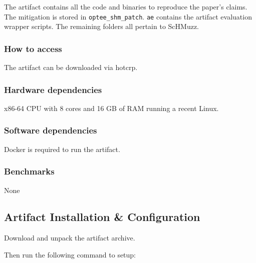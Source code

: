 \documentclass[conference]{IEEEtran}
\begin{document}

The artifact contains all the code and binaries to reproduce the paper's claims. 
The mitigation is stored in \texttt{optee\_shm\_patch}. \texttt{ae} contains the artifact evaluation wrapper scripts.
The remaining folders all pertain to ScHMuzz. 

\subsubsection{How to access}
The artifact can be downloaded via hotcrp.

\subsubsection{Hardware dependencies}
x86-64 CPU with 8 cores and 16 GB of RAM running a recent Linux.

\subsubsection{Software dependencies}
Docker is required to run the artifact.

\subsubsection{Benchmarks}
None


\subsection{Artifact Installation \& Configuration}

Download and unpack the artifact archive. 

Then run the following command to setup: 
\end{document}

